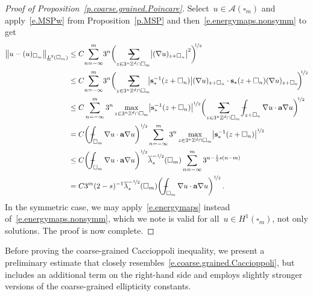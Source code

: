 \documentclass[11pt,twoside]{article} %
\makeatletter
\let\oldsquare\square %
\renewcommand{\square}{\oldsquare}
\numberwithin{equation}{section}
\theoremstyle{definition}
\newcommand*{\Zd}{\ensuremath{\mathbb{Z}^d}}
\newcommand{\s}{\mathbf{s}}
\renewcommand{\a}{\mathbf{a}}
\newcommand{\cu}{\square}
\newcommand{\avsum}{\mathop{\mathpalette\avsuminner\relax}\displaylimits}
\newcommand\avsuminner[2]{%
  {\sbox0{$\m@th#1\sum$}%
   \vphantom{\usebox0}%
   \ooalign{%
     \hidewidth
     \smash{\,\rule[.23em]{8.8pt}{1.1pt} \relax}%
     \hidewidth\cr
   ~$\m@th#1\sum$\cr
   }%
  }%
}
\def\Xint#1{\mathchoice
{\XXint\displaystyle\textstyle{#1}}%
{\XXint\textstyle\scriptstyle{#1}}%
{\XXint\scriptstyle\scriptscriptstyle{#1}}%
{\XXint\scriptscriptstyle\scriptscriptstyle{#1}}%
\!\int}
\def\XXint#1#2#3{{\setbox0=\hbox{$#1{#2#3}{\int}$}
\vcenter{\hbox{$#2#3$}}\kern-.5\wd0}}
\def\fint{\Xint-}
\newcommand{\A}{\mathcal{A}}
\makeatother
\begin{document}
\begin{proof}[{Proof of Proposition~\ref{p.coarse.grained.Poincare}}]
Select~$u\in \A(\cu_m)$ and apply~\eqref{e.MSPw} from Proposition~\ref{p.MSP} and then~\eqref{e.energymaps.nonsymm} to get 
\begin{align*}
\bigl\| u - (u)_{\cu_m} \bigr\|_{\underline{L}^2(\cu_m)} 
&
\leq 
C\! \sum_{n=-\infty}^{{m}} \!
3^{n} 
\biggl( 
\avsum_{z\in 3^n\Zd\cap \cu_{m}} 
\bigl|  ( \nabla u )_{z+\cu_n} \bigr|^2
\biggr)^{\!\!\nicefrac12}
\notag \\ & 
\leq 
C\! \sum_{n=-\infty}^{{m}} \!
3^{n} 
\biggl( 
\avsum_{z \in 3^n\Zd\cap \cu_m} \! \!
\bigl| \s_*^{-1}(z+\cu_n) \bigr|  
( \nabla u   )_{z+\cu_n} 
\cdot
\s_*(z+\cu_n) 
( \nabla u )_{z+\cu_n} \!
\biggr)^{\!\!\nicefrac12}
\notag \\ & 
\leq
C \sum_{n=-\infty}^{{m}} 3^{n} 
\max_{z\in 3^n\Zd\cap \cu_m}
\bigl| \s_*^{-1}(z+\cu_n) \bigr|^{\nicefrac12}   
\biggl( 
\avsum_{z\in 3^n\Zd\cap \cu_m} 
\fint_{z+\cu_n}  \nabla u \cdot \a\nabla u
\biggr)^{\!\nicefrac12}
\notag \\ & 
= 
C \biggl(  \fint_{\cu_m} 
\nabla u \cdot \a\nabla u\biggr)^{\nicefrac12}
\sum_{n=-\infty}^{{m}} 3^{n} 
\max_{z\in 3^n\Zd\cap \cu_m }
\bigl| \s_*^{-1}(z+\cu_n) \bigr|^{\nicefrac12}  
\notag \\ & 
\leq 
C \biggl(  \fint_{\cu_m} 
\nabla u \cdot \a\nabla u\biggr)^{\nicefrac12}
\overline{\lambda}^{-\nicefrac12}_{s} (\cu_m)
\sum_{n=-\infty}^{{m}} 3^{n-\frac12s(n-m)} 
\notag \\ & 
=
C3^m(2-s)^{-1} \overline{\lambda}^{-\nicefrac12}_{s} (\cu_m) 
\biggl(  \fint_{\cu_m} 
\nabla u \cdot \a\nabla u\biggr)^{\nicefrac12}
\,.
\end{align*}
In the symmetric case, we may apply~\eqref{e.energymaps} instead of~\eqref{e.energymaps.nonsymm}, which we note is valid for all~$u\in H^1(\cu_m)$, not only solutions. 
The proof is now complete. 
\end{proof}

Before proving the coarse-grained Caccioppoli inequality, we present a preliminary estimate that closely resembles~\eqref{e.coarse.grained.Caccioppoli}, but includes an additional term on the right-hand side and employs slightly stronger versions of the coarse-grained ellipticity constants.

\smallskip
\end{document}
